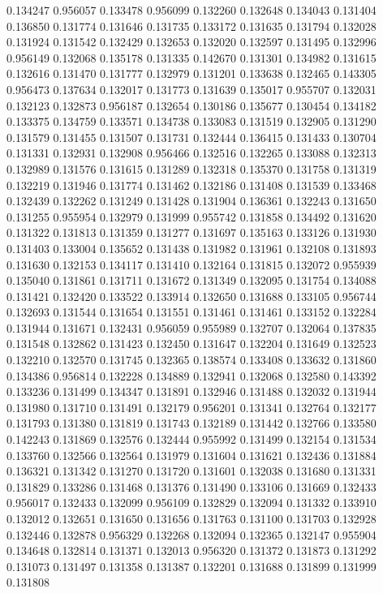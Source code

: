 0.134247
0.956057
0.133478
0.956099
0.132260
0.132648
0.134043
0.131404
0.136850
0.131774
0.131646
0.131735
0.133172
0.131635
0.131794
0.132028
0.131924
0.131542
0.132429
0.132653
0.132020
0.132597
0.131495
0.132996
0.956149
0.132068
0.135178
0.131335
0.142670
0.131301
0.134982
0.131615
0.132616
0.131470
0.131777
0.132979
0.131201
0.133638
0.132465
0.143305
0.956473
0.137634
0.132017
0.131773
0.131639
0.135017
0.955707
0.132031
0.132123
0.132873
0.956187
0.132654
0.130186
0.135677
0.130454
0.134182
0.133375
0.134759
0.133571
0.134738
0.133083
0.131519
0.132905
0.131290
0.131579
0.131455
0.131507
0.131731
0.132444
0.136415
0.131433
0.130704
0.131331
0.132931
0.132908
0.956466
0.132516
0.132265
0.133088
0.132313
0.132989
0.131576
0.131615
0.131289
0.132318
0.135370
0.131758
0.131319
0.132219
0.131946
0.131774
0.131462
0.132186
0.131408
0.131539
0.133468
0.132439
0.132262
0.131249
0.131428
0.131904
0.136361
0.132243
0.131650
0.131255
0.955954
0.132979
0.131999
0.955742
0.131858
0.134492
0.131620
0.131322
0.131813
0.131359
0.131277
0.131697
0.135163
0.133126
0.131930
0.131403
0.133004
0.135652
0.131438
0.131982
0.131961
0.132108
0.131893
0.131630
0.132153
0.134117
0.131410
0.132164
0.131815
0.132072
0.955939
0.135040
0.131861
0.131711
0.131672
0.131349
0.132095
0.131754
0.134088
0.131421
0.132420
0.133522
0.133914
0.132650
0.131688
0.133105
0.956744
0.132693
0.131544
0.131654
0.131551
0.131461
0.131461
0.133152
0.132284
0.131944
0.131671
0.132431
0.956059
0.955989
0.132707
0.132064
0.137835
0.131548
0.132862
0.131423
0.132450
0.131647
0.132204
0.131649
0.132523
0.132210
0.132570
0.131745
0.132365
0.138574
0.133408
0.133632
0.131860
0.134386
0.956814
0.132228
0.134889
0.132941
0.132068
0.132580
0.143392
0.133236
0.131499
0.134347
0.131891
0.132946
0.131488
0.132032
0.131944
0.131980
0.131710
0.131491
0.132179
0.956201
0.131341
0.132764
0.132177
0.131793
0.131380
0.131819
0.131743
0.132189
0.131442
0.132766
0.133580
0.142243
0.131869
0.132576
0.132444
0.955992
0.131499
0.132154
0.131534
0.133760
0.132566
0.132564
0.131979
0.131604
0.131621
0.132436
0.131884
0.136321
0.131342
0.131270
0.131720
0.131601
0.132038
0.131680
0.131331
0.131829
0.133286
0.131468
0.131376
0.131490
0.133106
0.131669
0.132433
0.956017
0.132433
0.132099
0.956109
0.132829
0.132094
0.131332
0.133910
0.132012
0.132651
0.131650
0.131656
0.131763
0.131100
0.131703
0.132928
0.132446
0.132878
0.956329
0.132268
0.132094
0.132365
0.132147
0.955904
0.134648
0.132814
0.131371
0.132013
0.956320
0.131372
0.131873
0.131292
0.131073
0.131497
0.131358
0.131387
0.132201
0.131688
0.131899
0.131999
0.131808
